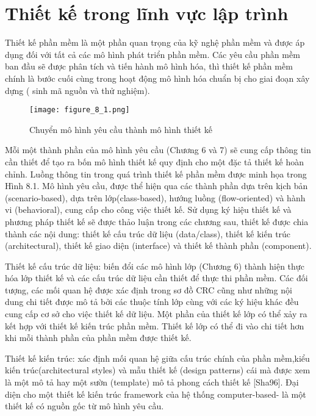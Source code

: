 \documentclass[./../SoftwareEngineering.tex]{subfiles}
\begin{document}
	\section{Thiết kế trong lĩnh vực lập trình}
	Thiết kế phần mềm là một phần quan trọng của kỹ nghệ phần mềm và được áp dụng đối với tất cả các mô hình phát triển phần mềm. Các yêu cầu phần mềm ban đầu sẽ được phân tích và tiến hành mô hình hóa, thì thiết kế phần mềm chính là bước cuối cùng trong hoạt động mô hình hóa chuẩn bị cho giai đoạn xây dựng ( sinh mã nguồn và thử nghiệm).
	\begin{figure}
		\centering
		\texttt{[image: figure\_8\_1.png]}
		\caption{Chuyển mô hình yêu cầu thành mô hình thiết kế}
		\label{fig8_1}
	\end{figure}
	
	Mỗi một thành phần của mô hình yêu cầu (Chương 6 và 7) sẽ cung cấp thông tin cần thiết để tạo ra bốn mô hình thiết kế quy định cho một đặc tả thiết kế hoàn chỉnh. Luồng thông tin trong quá trình thiết kế phần mềm được minh họa trong Hình 8.1. Mô hình yêu cầu, được thể hiện qua các thành phần dựa trên kịch bản (scenario-based), dựa trên lớp(class-based), hướng luồng (flow-oriented) và hành vi (behavioral), cung cấp cho công việc thiết kế. Sử dụng ký hiệu thiết kế và phương pháp thiết kế sẽ được thảo luận trong các chương sau, thiết kế được chia thành các nội dung:  thiết kế cấu trúc dữ liệu (data/class), thiết kế kiến trúc (architectural), thiết kế giao diện (interface) và thiết kế thành phần (component).
	
	Thiết kế cấu trúc dữ liệu: biến đổi các mô hình lớp (Chương 6) thành hiện thực hóa lớp thiết kế và các cấu trúc dữ liệu cần thiết để thực thi phần mềm. Các đối tượng, các mối quan hệ được xác định trong sơ đồ CRC cũng như những nội dung chi tiết được mô tả bởi các thuộc tính lớp cùng với các ký hiệu khác đều cung cấp cơ sở cho việc thiết kế dữ liệu. Một phần của thiết kế lớp có thể xảy ra kết hợp với thiết kế kiến trúc phần mềm. Thiết kế lớp có thể đi vào chi tiết hơn khi mỗi thành phần của phần mềm được thiết kế.
	
	Thiết kế kiến trúc: xác định mối quan hệ giữa cấu trúc chính của phần mềm,kiểu kiến trúc(architectural styles) và mẫu thiết kế (design patterns) cái mà được xem là một mô tả hay một sườn (template) mô tả phong cách thiết kế [Sha96]. Đại diện cho một thiết kế kiến trúc framework của hệ thống computer-based- là một thiết kế có nguồn gốc từ mô hình yêu cầu.
\end{document}
